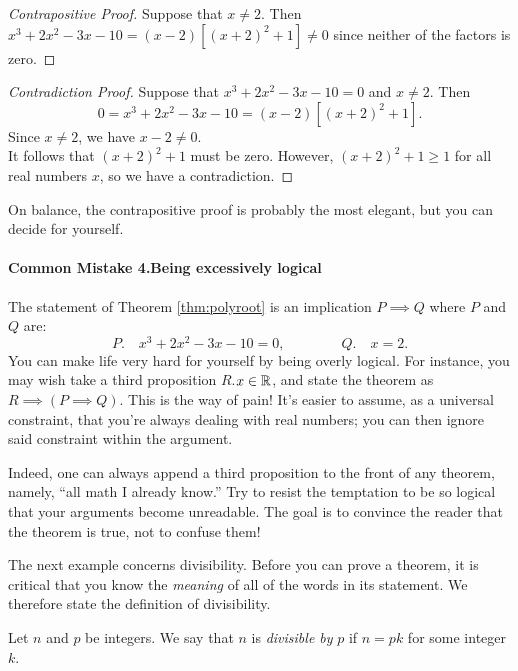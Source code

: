 \begin{proof}[Contrapositive Proof]
Suppose that $x\neq 2$. Then $x^3+2x^2-3x-10=(x-2)[(x+2)^2+1]\neq 0$ since neither of the factors is zero.
\end{proof}

\begin{proof}[Contradiction Proof]
Suppose that $x^3+2x^2-3x-10=0$ and $x\neq 2$. Then
\[0=x^3+2x^2-3x-10=(x-2)[(x+2)^2+1].\]
Since $x\neq 2$, we have $x-2\neq 0$.\\
It follows that $(x+2)^2+1$ must be zero. However, $(x+2)^2+1\ge 1$ for all real numbers $x$, so we have a contradiction.
\end{proof}

 On balance, the contrapositive proof is probably the most elegant, but you can decide for yourself.


\paragraph{Common Mistake 4.\quad Being excessively logical}

The statement of Theorem \ref{thm:polyroot} is an implication $P\implies Q$ where $P$ and $Q$ are:
\[P.\quad x^3+2x^2-3x-10=0, \qquad\qquad Q.\quad x=2.\]
You can make life very hard for yourself by being overly logical. For instance, you may wish take a third proposition $R$.\quad $x\in\mathbb{R}$, and state the theorem as $R\implies (P\implies Q)$. This is the way of pain! It's easier to assume, as a universal constraint, that you're always dealing with real numbers; you can then ignore said constraint within the argument.

 Indeed, one can always append a third proposition to the front of any theorem, namely, ``all math I already know.'' Try to resist the temptation to be so logical that your arguments become unreadable. The goal is to convince the reader that the theorem is true, not to confuse them!


The next example concerns divisibility. Before you can prove a theorem, it is critical that you know the \emph{meaning} of all of the words in its statement. We therefore state the definition of divisibility.

\begin{defn}{}{}
Let $n$ and $p$ be integers. We say that $n$ is \emph{divisible by} $p$ if $n=pk$ for some integer $k$.
\end{defn}

